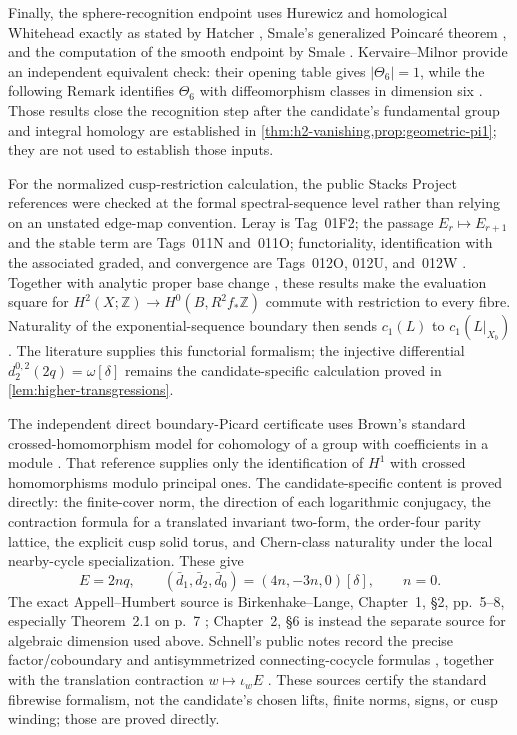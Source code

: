 Finally, the sphere-recognition endpoint uses Hurewicz and homological
Whitehead exactly as stated by Hatcher
\cite[Theorem~4.32 and Corollary~4.33]{Hatcher2002}, Smale's generalized
Poincar\'e theorem \cite[Theorem~A]{Smale1961}, and the computation of the
smooth endpoint by Smale
\cite[Theorem~1.1 and Corollary~1.2]{Smale1962}.  Kervaire--Milnor provide
an independent equivalent check: their opening table gives
$|\Theta_6|=1$, while the following Remark identifies $\Theta_6$ with
diffeomorphism classes in dimension six
\cite[pp.~504--505]{KervaireMilnor1963}.  Those results close the recognition
step after the candidate's fundamental group and integral homology are
established in \cref{thm:h2-vanishing,prop:geometric-pi1}; they are not used
to establish those inputs.

For the normalized cusp-restriction calculation, the public Stacks Project
references were checked at the formal spectral-sequence level rather than
relying on an unstated edge-map convention.  Leray is Tag~01F2; the passage
$E_r\mapsto E_{r+1}$ and the stable term are Tags~011N and~011O;
functoriality, identification with the associated graded, and convergence
are Tags~012O, 012U, and~012W \cite{StacksProject}.  Together with analytic
proper base change \cite[Theorem~2.3.26]{Dimca2004}, these results make the
evaluation square for
$H^2(X;\mathbb Z)\to H^0(B,R^2f_*\mathbb Z)$ commute with restriction to
every fibre.  Naturality of the exponential-sequence boundary then sends
$c_1(L)$ to $c_1(L|_{X_b})$.  The literature supplies this functorial
formalism; the injective differential
$d_2^{0,2}(2q)=\omega[\delta]$ remains the candidate-specific calculation
proved in \cref{lem:higher-transgressions}.

The independent direct boundary-Picard certificate uses Brown's standard
crossed-homomorphism model for cohomology of a group with coefficients in a
module \cite[Chapter~I, \S5]{Brown1982}.  That reference supplies only the
identification of $H^1$ with crossed homomorphisms modulo principal ones.  The
candidate-specific content is proved directly: the finite-cover norm, the
direction of each logarithmic conjugacy, the contraction formula for a
translated invariant two-form, the order-four parity lattice, the explicit
cusp solid torus, and Chern-class naturality under the local nearby-cycle
specialization.  These give
\[
 E=2nq,\qquad
 (\bar d_1,\bar d_2,\bar d_0)=(4n,-3n,0)[\delta],\qquad n=0.
\]
The exact Appell--Humbert source is Birkenhake--Lange, Chapter~1, \S2,
pp.~5--8, especially Theorem~2.1 on p.~7
\cite{BirkenhakeLange1999}; Chapter~2, \S6 is instead the separate source for
algebraic dimension used above.  Schnell's public notes record the precise
factor/coboundary and antisymmetrized connecting-cocycle formulas
\cite[equations~(3.3)--(3.10), pp.~3--7]{SchnellLecture3}, together with the
translation contraction $w\mapsto\iota_wE$
\cite[equation~(6.2), p.~1]{SchnellLecture6}.  These sources certify the
standard fibrewise formalism, not the candidate's chosen lifts, finite norms,
signs, or cusp winding; those are proved directly.

